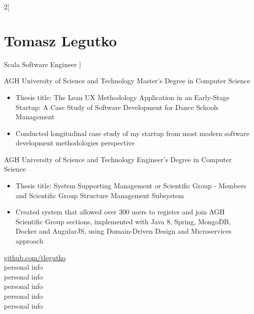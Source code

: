 \documentclass{tccv}
\begin{document}
\begin{multicols}{2}[
\part{Tomasz Legutko}{Scala Software Engineer}
]
\begin{eventlist}
     {AGH University of Science and Technology}
     {Master's Degree in Computer Science}
     \begin{itemize}[noitemsep,topsep=0pt]
     \item Thesis title: The Lean UX Methodology Application in an Early-Stage Startup: A Case Study of Software Development for Dance Schools Management
     \item Conducted longitudinal case study of my startup from most modern software development methodologies perspective %
     \end{itemize}

     {AGH University of Science and Technology}
     {Engineer's Degree in Computer Science}
     \begin{itemize}[noitemsep,topsep=0pt]
     \item Thesis title: System Supporting Management or Scientific Group - Members and Scientific Group Structure Management Subsystem
     \item Created system that allowed over 300 users to register and join AGH Scientific Group sections, implemented with Java 8, Spring, MongoDB, Docker and AngularJS, using Domain-Driven Design and Microservices approach
     \end{itemize}

\end{eventlist}

\vfill\null
\columnbreak

\hspace*{0.7pt}\faGithub\hspace{1pt} \href{https://github.com/tlegutko}{github.com/tlegutko}\\
\faEnvelope\hspace{0.5pt} personal info\\
\hspace*{1.4pt}\faPhone\hspace{1.2pt} personal info\\ 
\hspace*{2.5pt}\faMapMarker\hspace{2pt} personal info\\
\hspace*{2.6pt}\phantom\faMapMarker \hspace{2pt} personal info\\
\faBirthdayCake\hspace{0.7pt} personal info\\


\end{multicols}
\end{document}
